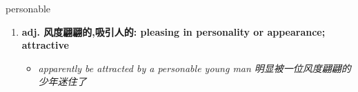 
\begin{frame}
{\huge personable}
\begin{center}
\begin{enumerate}\Large
  \item \textbf{adj. 风度翩翩的,吸引人的: pleasing in personality or appearance; attractive}
  \begin{itemize}
    \item \em{\Large{apparently be attracted by a personable young man 明显被一位风度翩翩的少年迷住了}}
  \end{itemize}
\end{enumerate}
\end{center}
\end{frame}
